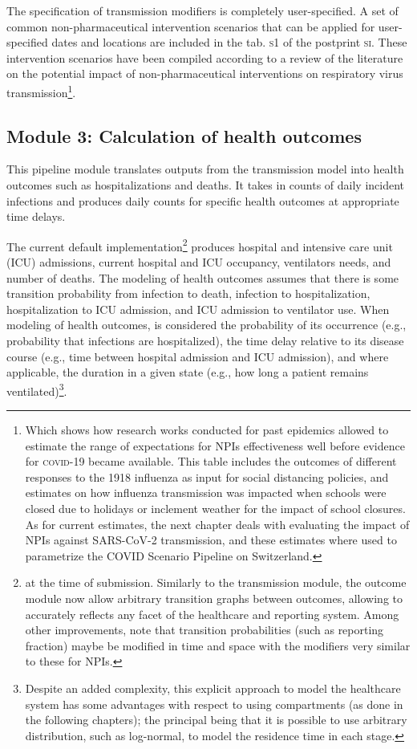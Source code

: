 {The specification of transmission modifiers is completely user-specified. A set of common non-pharmaceutical intervention scenarios that can be applied for user-specified dates and locations are included in the tab. \textsc{s1} of the postprint \textsc{si}. These intervention scenarios have been compiled according to a review of the literature on the potential impact of non-pharmaceutical interventions on respiratory virus transmission\footnote{Which shows how research works conducted for past epidemics allowed to estimate the range of expectations for NPIs effectiveness well before evidence for \textsc{covid}-19 became available. This table includes \eg the outcomes of different responses to the 1918 influenza as input for social distancing policies, and estimates on how influenza transmission was impacted when schools were closed due to holidays or inclement weather for the impact of school closures. As for current estimates, the next chapter deals with evaluating the impact of NPIs against SARS-CoV-2 transmission, and these estimates where used to parametrize the COVID Scenario Pipeline on Switzerland.}.

\subsection{Module 3: Calculation of health outcomes}
This pipeline module translates outputs from the transmission model into health outcomes such as hospitalizations and deaths. It takes in counts of daily incident infections and produces daily counts for specific health outcomes at appropriate time delays.

The current default implementation\footnote{at the time of submission. Similarly to the transmission module, the outcome module now allow arbitrary transition graphs between outcomes, allowing to accurately reflects any facet of the healthcare and reporting system. Among other improvements, note that transition probabilities (such as reporting fraction) maybe be modified in time and space with the modifiers very similar to these for NPIs.} produces hospital and intensive care unit (ICU) admissions, current hospital and ICU occupancy, ventilators needs, and number of deaths. The modeling of health outcomes assumes that there is some transition probability from infection to death, infection to hospitalization, hospitalization to ICU admission, and ICU admission to ventilator use. When modeling of health outcomes, is considered the probability of its occurrence (e.g., probability that infections are hospitalized), the time delay relative to its disease course (e.g., time between hospital admission and ICU admission), and where applicable, the duration in a given state (e.g., how long a patient remains ventilated)\footnote{Despite an added complexity, this explicit approach to model the healthcare system has some advantages with respect to using compartments (as done in the following chapters); the principal being that it is possible to use arbitrary distribution,  such as log-normal, to model the residence time in each stage.}.

}
